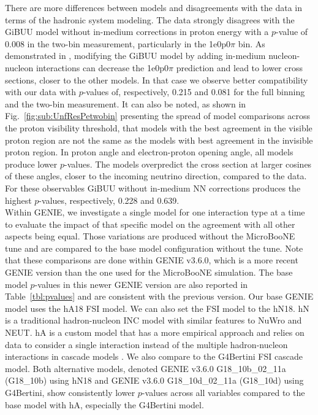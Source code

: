 \documentclass[amsmath,amssymb,aps,prd,showpacs,twocolumn,superscriptaddress,letterpaper,longbibliography, floatfix]{revtex4-2}
\begin{document}
There are more differences between models and disagreements with the data in terms of the hadronic system modeling. The data strongly disagrees with the GiBUU model without in-medium corrections \cite{INMEDIUMGIBUU} in proton energy with a $p$-value of 0.008 in the two-bin measurement, particularly in the 1e0p0$\pi$ bin. As demonstrated in \cite{INMEDIUMGIBUU}, modifying the GiBUU model by adding in-medium nucleon-nucleon interactions can decrease the 1e0p0$\pi$ prediction and lead to lower cross sections, closer to the other models. In that case we observe better compatibility with our data with $p$-values of, respectively, 0.215 and 0.081 for the full binning and the two-bin measurement. It can also be noted, as shown in Fig.~\ref{fig:sub:UnfResPetwobin} presenting the spread of model comparisons across the proton visibility threshold, that models with the best agreement in the visible proton region are not the same as the models with best agreement in the invisible proton region.
In proton angle and electron-proton opening angle, all models produce lower $p$-values. The models overpredict the cross section at larger cosines of these angles, closer to the incoming neutrino direction, compared to the data. For these observables GiBUU without in-medium NN corrections produces the highest $p$-values, respectively, 0.228 and 0.639. \\

Within GENIE, we investigate a single model for one interaction type at a time to evaluate the impact of that specific model on the agreement with all other aspects being equal. Those variations are produced without the MicroBooNE tune and are compared to the base model configuration without the tune. Note that these comparisons are done within GENIE v3.6.0, which is a more recent GENIE version than the one used for the MicroBooNE simulation. The base model $p$-values in this newer GENIE version are also reported in Table~\ref{tbl:pvalues} and are consistent with the previous version. %
Our base GENIE model uses the hA18 FSI model. We can also set the FSI model to the hN18. hN is a traditional hadron-nucleon INC model with similar features to NuWro and NEUT. hA is a custom model that has a more empirical approach and relies on data to consider a single interaction instead of the multiple hadron-nucleon interactions in cascade models \cite{CompHAHN}.  We also compare to the G4Bertini \cite{BertiniG4} FSI cascade model. Both alternative models, denoted GENIE v3.6.0 G18\_10b\_02\_11a (G18\_10b) using hN18 and GENIE v3.6.0 G18\_10d\_02\_11a (G18\_10d) using G4Bertini, show consistently lower $p$-values across all variables compared to the base model with hA, especially the G4Bertini model. \\
\end{document}
